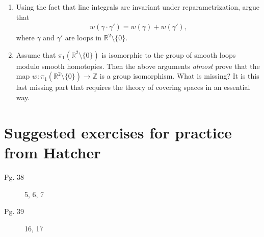 \documentclass{article}
\begin{document}
\begin{enumerate}
\begin{enumerate}[resume]
        \item Using the fact that line integrals are invariant under reparametrization, argue that
        \begin{align*}
            w(\gamma \cdot \gamma') = w(\gamma) + w(\gamma'),
        \end{align*}
        where $\gamma$ and $\gamma'$ are loops in $\mathbb{R}^2 \setminus \{ 0 \}$.
        \item 
        Assume that $\pi_1(\mathbb{R}^2 \setminus \{ 0 \})$ is isomorphic to the group of smooth loops modulo smooth homotopies.
        Then the above arguments \emph{almost} prove that the map $w: \pi_1(\mathbb{R}^2 \setminus \{ 0 \}) \to \mathbb{Z}$ is a group isomorphism.
        What is missing? It is this last missing part that requires the theory of covering spaces in an essential way.
    \end{enumerate}
    
    

\end{enumerate}


\section*{Suggested exercises for practice from Hatcher}

\begin{description}
    \item[Pg. 38] 5, 6, 7
    \item[Pg. 39] 16, 17
\end{description}
\end{document}
